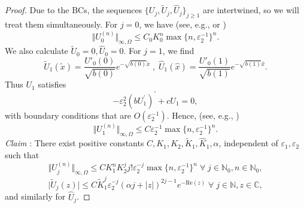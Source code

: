 \documentclass[12pt]{article}
\newcommand{\eps}{\varepsilon}
\begin{document}
\begin{proof}
%
Due to the BCs, the sequences $\{U_j, \tilde{U}_j,  \hat{U}_j\}_{j\ge 1}$ are intertwined, so we will treat them simultaneously. For $j=0$, we have (see, e.g., \cite[Prop. 2.3.1]{PC} or \cite{melenk})
%
$$
\Vert U_0^{(n)}\Vert_{\infty, \Omega} \leq C_{0} K_{0}^{n} \max\{ n, \eps_2^{-1}\}^{n}.
$$
We also calculate $\tilde{U}_0 = 0, \hat{U}_0 = 0$. For $j=1$, we find
%
$$
\tilde{U}_1(\tilde{x}) = \frac{U'_0(0)}{\sqrt{b(0)}} e^{-\sqrt{b(0)} \tilde{x}} \; , \; 
\hat{U}_1(\hat{x}) = \frac{U'_0(1)}{\sqrt{b(1)}} e^{-\sqrt{b(1)} \hat{x}}.
$$
%
Thus $U_1$ satisfies
%
$$
 -\eps_2^2 \left(b U_1^{\prime}\right)^{\prime}+c U_1=0,
$$
with boundary conditions that are $O(\eps_2^{-1})$. Hence, (see, e.g., \cite{melenk})
%
$$
\Vert U^{(n)}_1 \Vert_{\infty, \Omega} \leq C \eps_2^{-1} \max \{n, \eps_2^{-1} \}^n.
$$
%
%
%
%
%
%
%
\textit{Claim} : There exist positive constants $C, K_1, K_2, \tilde{K}_1, \hat{K}_1, \alpha$, independent of
$\eps_1, \eps_2$ such that 
%
\begin{equation}\label{claim_a}
\Vert U_j^{(n)}\Vert_{\infty, \Omega} \leq C K_{1}^{n} K_2^j j! \eps_2^{-j} \max\{ n, \eps_2^{-1} \}^{n} \; \forall \; j \in \mathbb{N}_0, n \in \mathbb{N}_0,
\end{equation}
%
\begin{equation}\label{claim_b}
\vert \tilde{U}_j (z) \vert \leq C  \tilde{K}^j_1  \eps_2^{-j} (\alpha j +|z|)^{2j-1} e^{-\text{Re}(z)} \; \forall \; j \in \mathbb{N}, z \in \mathbb{C},
%
\end{equation}
and similarly for $\hat{U}_j$.


\end{proof}
\end{document}
